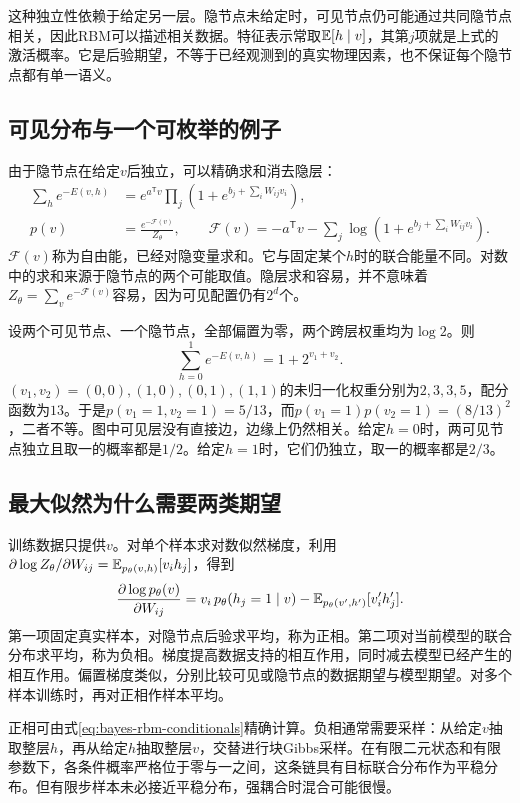 这种独立性依赖于给定另一层。隐节点未给定时，可见节点仍可能通过共同隐节点相关，因此RBM可以描述相关数据。特征表示常取$\mathbb{E}[h\mid v]$，其第$j$项就是上式的激活概率。它是后验期望，不等于已经观测到的真实物理因素，也不保证每个隐节点都有单一语义。

\subsection{可见分布与一个可枚举的例子}
由于隐节点在给定$v$后独立，可以精确求和消去隐层：
\begin{align}
 \sum_h e^{-E(v,h)}
 &=e^{a^{\mathsf T}v}\prod_j\left(1+e^{b_j+\sum_iW_{ij}v_i}\right),\\
 p(v)&=\frac{e^{-\mathcal F(v)}}{Z_\theta},\qquad
 \mathcal F(v)=-a^{\mathsf T}v-\sum_j\log\left(1+e^{b_j+\sum_iW_{ij}v_i}\right).
 \label{eq:bayes-rbm-free-energy}
\end{align}
$\mathcal F(v)$称为自由能，已经对隐变量求和。它与固定某个$h$时的联合能量不同。对数中的求和来源于隐节点的两个可能取值。隐层求和容易，并不意味着$Z_\theta=\sum_v e^{-\mathcal F(v)}$容易，因为可见配置仍有$2^d$个。

设两个可见节点、一个隐节点，全部偏置为零，两个跨层权重均为$\log2$。则
\begin{equation}
 \sum_{h=0}^1e^{-E(v,h)}=1+2^{v_1+v_2}.
\end{equation}
$(v_1,v_2)=(0,0),(1,0),(0,1),(1,1)$的未归一化权重分别为$2,3,3,5$，配分函数为$13$。于是$p(v_1=1,v_2=1)=5/13$，而$p(v_1=1)p(v_2=1)=(8/13)^2$，二者不等。图中可见层没有直接边，边缘上仍然相关。给定$h=0$时，两可见节点独立且取一的概率都是$1/2$。给定$h=1$时，它们仍独立，取一的概率都是$2/3$。

\subsection{最大似然为什么需要两类期望}
训练数据只提供$v$。对单个样本求对数似然梯度，利用$\partial\log Z_\theta/\partial W_{ij}=\mathbb{E}_{p_\theta(v,h)}[v_ih_j]$，得到
\begin{equation}
 \frac{\partial\log p_\theta(v)}{\partial W_{ij}}
 =v_i\,p_\theta(h_j=1\mid v)
 -\mathbb{E}_{p_\theta(v',h')}[v_i'h_j'].
 \label{eq:bayes-rbm-gradient}
\end{equation}
第一项固定真实样本，对隐节点后验求平均，称为正相。第二项对当前模型的联合分布求平均，称为负相。梯度提高数据支持的相互作用，同时减去模型已经产生的相互作用。偏置梯度类似，分别比较可见或隐节点的数据期望与模型期望。对多个样本训练时，再对正相作样本平均。

正相可由式\eqref{eq:bayes-rbm-conditionals}精确计算。负相通常需要采样：从给定$v$抽取整层$h$，再从给定$h$抽取整层$v$，交替进行块Gibbs采样。在有限二元状态和有限参数下，各条件概率严格位于零与一之间，这条链具有目标联合分布作为平稳分布。但有限步样本未必接近平稳分布，强耦合时混合可能很慢。

